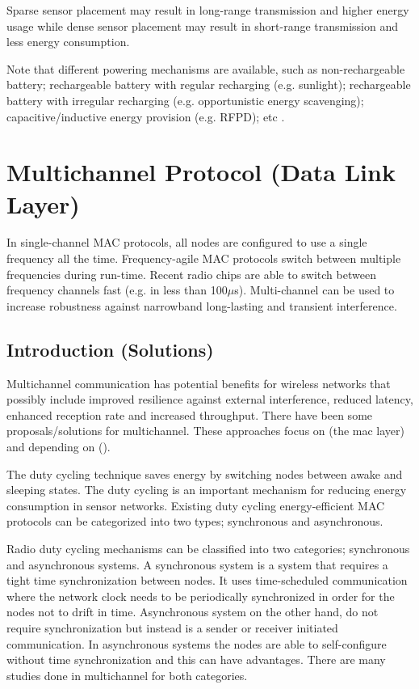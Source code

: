 Sparse sensor placement may result in long-range transmission and higher energy usage while dense sensor placement may result in short-range transmission and less energy consumption.

Note that different powering mechanisms are available, such as non-rechargeable battery; rechargeable battery with regular recharging (e.g. sunlight); rechargeable battery with irregular recharging (e.g. opportunistic energy scavenging); capacitive/inductive energy provision (e.g. RFPD); etc \cite{macsurvey}.

\section{Multichannel Protocol (Data Link Layer)}
In single-channel MAC protocols, all nodes are configured to use a single frequency all the time. Frequency-agile MAC protocols switch between multiple frequencies during run-time. Recent radio chips are able to switch between frequency channels fast (e.g. in less than 100$\mu$s). Multi-channel can be used to increase robustness against narrowband long-lasting and transient interference. \cite{macsurvey}

\subsection{Introduction (Solutions)}
Multichannel communication has potential benefits for wireless networks that possibly include improved resilience against external interference, reduced latency, enhanced reception rate and increased throughput. 
There have been some proposals/solutions for multichannel. These approaches focus on (the mac layer) and depending on ().

The duty cycling technique saves energy by switching nodes between awake and sleeping states. The duty cycling is an important mechanism for reducing energy consumption in sensor networks. Existing duty cycling energy-efficient MAC protocols can be categorized into two types; synchronous and asynchronous.

Radio duty cycling mechanisms can be classified into two categories; synchronous and asynchronous systems. A synchronous system is a system that requires a tight time synchronization between nodes. It uses time-scheduled communication where the network clock needs to be periodically synchronized in order for the nodes not to drift in time. Asynchronous system on the other hand, do not require synchronization but instead is a sender or receiver initiated communication. In asynchronous systems the nodes are able to self-configure without time synchronization and this can have advantages. There are many studies done in multichannel for both categories.

